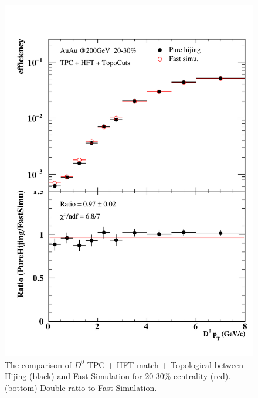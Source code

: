 \begin{figure}[htbp]
\begin{minipage}[htbp]{0.47\linewidth}
\includegraphics[width=1.0\textwidth,angle=0]{figure/Run14_D0HFT/20_30_2.pdf} 
\caption{ The comparison of $D^0$ TPC + HFT match + Topological between Hijing (black) and Fast-Simulation for 20-30\% centrality (red). (bottom) Double ratio to Fast-Simulation.\label{20_30}}
\end{minipage}
\end{figure}

